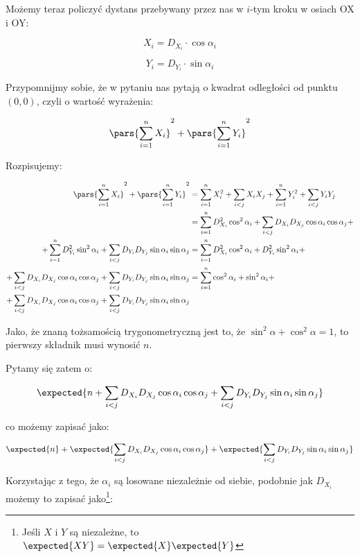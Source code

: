 Możemy teraz policzyć dystans przebywany przez nas w \(i\)-tym kroku w osiach OX i OY: 

\[
    X_i = D_{X_i} \cdot \cos{\alpha_i} 
\]

\[ 
    Y_i = D_{Y_i} \cdot \sin{\alpha_i}
\]

Przypomnijmy sobie, że w pytaniu nas pytają o kwadrat odległości od punktu \((0, 0)\), czyli o wartość wyrażenia:

\[ 
    \pars{\sum_{i=1}^{n} X_i}^2 + \pars{\sum_{i=1}^{n} Y_i}^2
\]

Rozpisujemy:

\begin{align*}
        \pars{\sum_{i=1}^{n} X_i}^2 + \pars{\sum_{i=1}^{n} Y_i}^2 &= \sum_{i=1}^{n} X_{i}^2 + \sum_{i < j} X_{i}X_{j} + \sum_{i=1}^{n} Y_{i}^2 + \sum_{i < j} Y_{i} Y_{j} \\
        &= \sum_{i=1}^{n} D_{X_i}^2 \cos^2{\alpha_i} + \sum_{i < j} D_{X_i}D_{X_j} \cos{\alpha_i} \cos{\alpha_j} + \\ + \sum_{i=1}^{n} D_{Y_i}^2 \sin^2{\alpha_i} + \sum_{i < j} D_{Y_i} D_{Y_j} \sin{\alpha_i} \sin{\alpha_j} 
        &= \sum_{i=1}^{n} D_{X_i}^2 \cos^2{\alpha_i} + D_{Y_i}^2 \sin^2{\alpha_i} + \\
        + \sum_{i < j} D_{X_i}D_{X_j} \cos{\alpha_i} \cos{\alpha_j} + \sum_{i < j} D_{Y_i} D_{Y_j} \sin{\alpha_i} \sin{\alpha_j} &= \sum_{i=1}^{n} \cos^2{\alpha_i} + \sin^2{\alpha_i} + \\ 
        + \sum_{i < j} D_{X_i}D_{X_j} \cos{\alpha_i} \cos{\alpha_j} + \sum_{i < j} D_{Y_i} D_{Y_j} \sin{\alpha_i} \sin{\alpha_j}
\end{align*}

Jako, że znaną tożsamością trygonometryczną jest to, że \(\sin^2{\alpha} + \cos^2{\alpha} = 1\), to pierwszy składnik musi wynosić \(n\). 

Pytamy się zatem o:

\[ 
    \expected{n + \sum_{i < j} D_{X_i}D_{X_j} \cos{\alpha_i} \cos{\alpha_j} + \sum_{i < j} D_{Y_i} D_{Y_j} \sin{\alpha_i} \sin{\alpha_j}}
\]

co możemy zapisać jako:

\[
    \expected{n} + \expected{\sum_{i < j} D_{X_i}D_{X_j} \cos{\alpha_i} \cos{\alpha_j} } + \expected{\sum_{i < j} D_{Y_i} D_{Y_j} \sin{\alpha_i} \sin{\alpha_j}}
\]

Korzystając z tego, że \(\alpha_i\) są losowane niezależnie od siebie, podobnie jak \(D_{X_i}\) możemy to zapisać jako\footnote{Jeśli \(X\) i \(Y\) są niezależne, to \(\expected{XY} = \expected{X}\expected{Y}\)}:

